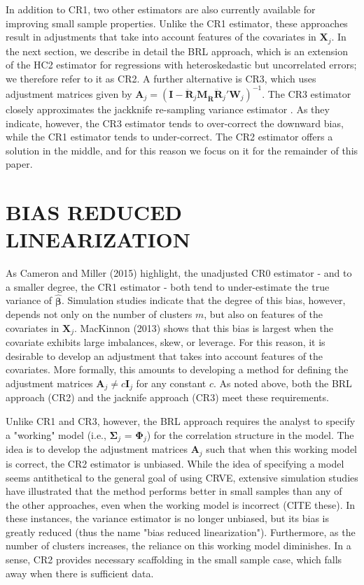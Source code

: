 \documentclass[12pt]{article}
\newcommand{\bm}{\mathbf}
\newcommand{\bs}{\boldsymbol}
\begin{document}
In addition to CR1, two other estimators are also currently available for improving small sample properties. 
Unlike the CR1 estimator, these approaches result in adjustments that take into account features of the covariates in $\bm{X}_j$. 
In the next section, we describe in detail the BRL approach, which is an extension of the HC2 estimator for regressions with heteroskedastic but uncorrelated errors; we therefore refer to it as CR2. 
A further alternative is CR3, which uses adjustment matrices given by $\bm{A}_j = \left(\bm{I} - \bm{\ddot{R}}_j \bm{M_{\ddot{R}}}\bm{\ddot{R}}_j'\bm{W}_j\right)^{-1}$. The CR3 estimator closely approximates the jackknife re-sampling variance estimator \citep{Bell2002bias, Mancl2001covariance}. 
As they indicate, however, the CR3 estimator tends to over-correct the downward bias, while the CR1 estimator tends to under-correct. 
The CR2 estimator offers a solution in the middle, and for this reason we focus on it for the remainder of this paper. 

\section{BIAS REDUCED LINEARIZATION}
\label{sec:BRL}

As Cameron and Miller (2015) highlight, the unadjusted CR0 estimator - and to a smaller degree, the CR1 estimator - both tend to under-estimate the true variance of $\hat{\bs\beta}$. Simulation studies indicate that the degree of this bias, however, depends not only on the number of clusters $m$, but also on features of the covariates in $\bm{X}_j$. 
MacKinnon (2013) shows that this bias is largest when the covariate exhibits large imbalances, skew, or leverage. 
For this reason, it is desirable to develop an adjustment that takes into account features of the covariates. 
More formally, this amounts to developing a method for defining the adjustment matrices $\bm{A}_j \neq c \bm{I}_j$ for any constant $c$. As noted above, both the BRL approach (CR2) and the jacknife approach (CR3) meet these requirements.

Unlike CR1 and CR3, however, the BRL approach requires the analyst to specify a "working" model (i.e., $\bs\Sigma_j$ = $\bs\Phi_j$) for the correlation structure in the model. The idea is to develop the adjustment matrices $\bm{A}_j$ such that when this working model is correct, the CR2 estimator is unbiased. 
While the idea of specifying a model seems antithetical to the general goal of using CRVE, extensive simulation studies have illustrated that the method performs better in small samples than any of the other approaches, even when the working model is incorrect (CITE these). 
In these instances, the variance estimator is no longer unbiased, but its bias is greatly reduced (thus the name "bias reduced linearization"). Furthermore, as the number of clusters increases, the reliance on this working model diminishes. 
In a sense, CR2 provides necessary scaffolding in the small sample case, which falls away when there is sufficient data.
\end{document}
